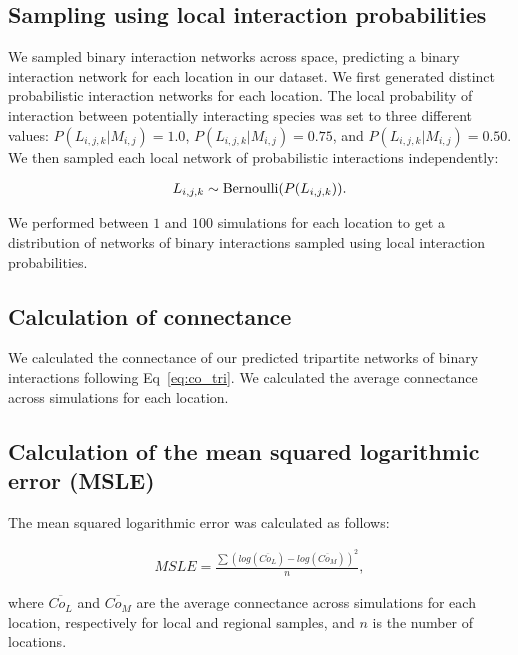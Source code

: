 \begin{refsection}
\subsection{Sampling using local interaction probabilities}

We sampled binary interaction networks across space, predicting a binary
interaction network for each location in our dataset. We first generated
distinct probabilistic interaction networks for each location. The local
probability of interaction between potentially interacting species was set to
three different values: $P(L_{i, j, k}|M_{i, j}) = 1.0$, $P(L_{i, j, k}|M_{i,
j}) = 0.75$, and $P(L_{i, j, k}|M_{i, j}) = 0.50$. We then sampled each local
network of probabilistic interactions independently: 

\begin{eqnarray}
    \label{eq:sample2_sup}
    L_{i, j, k} \sim {\rm Bernoulli}(P(L_{i, j, k})).
\end{eqnarray}

We performed between $1$ and $100$ simulations for each location to get a
distribution of networks of binary interactions sampled using local interaction
probabilities. 

\subsection{Calculation of connectance}

We calculated the connectance of our predicted tripartite networks of binary
interactions following Eq~\ref{eq:co_tri}. We calculated the average connectance
across simulations for each location.

\subsection{Calculation of the mean squared logarithmic error (MSLE)}

The mean squared logarithmic error was calculated as follows: 

\begin{eqnarray}
    \label{eq:MSLE_sup}
    MSLE = \frac{\sum (log(\overline{Co_L}) - log(\overline{Co_M}))^2}{n},
\end{eqnarray}

where $\overline{Co_L}$ and $\overline{Co_M}$ are the average connectance across
simulations for each location, respectively for local and regional samples, and
$n$ is the number of locations.


\begingroup
\let\clearpage\relax
\printbibliography
\endgroup
\end{refsection}


\endinput
